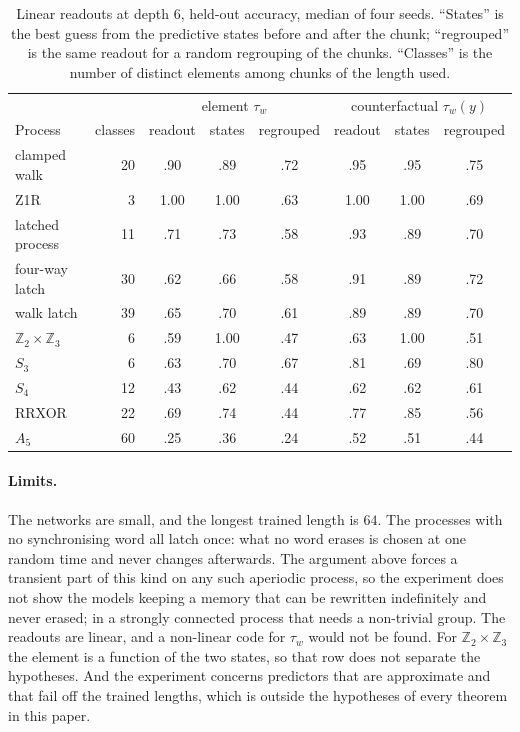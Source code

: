\documentclass[10pt]{article}
\theoremstyle{definition}
\theoremstyle{remark}
\begin{document}
\begin{table}[ht]
\centering
\small
\begin{tabular}{lrcccccc}
\hline
 & & \multicolumn{3}{c}{element $\tau_w$}
   & \multicolumn{3}{c}{counterfactual $\tau_w(y)$}\\
Process & classes & readout & states & regrouped
        & readout & states & regrouped\\
\hline
clamped walk & 20 & .90 & .89 & .72 & .95 & .95 & .75\\
Z1R & 3 & 1.00 & 1.00 & .63 & 1.00 & 1.00 & .69\\
latched process & 11 & .71 & .73 & .58 & .93 & .89 & .70\\
four-way latch & 30 & .62 & .66 & .58 & .91 & .89 & .72\\
walk latch & 39 & .65 & .70 & .61 & .89 & .89 & .70\\
$\mathbb Z_2\times\mathbb Z_3$ & 6 & .59 & 1.00 & .47 & .63 & 1.00 & .51\\
$S_3$ & 6 & .63 & .70 & .67 & .81 & .69 & .80\\
$S_4$ & 12 & .43 & .62 & .44 & .62 & .62 & .61\\
RRXOR & 22 & .69 & .74 & .44 & .77 & .85 & .56\\
$A_5$ & 60 & .25 & .36 & .24 & .52 & .51 & .44\\
\hline
\end{tabular}
\caption{Linear readouts at depth $6$, held-out accuracy, median of
four seeds.  ``States'' is the best guess from the predictive states
before and after the chunk; ``regrouped'' is the same readout for a
random regrouping of the chunks.  ``Classes'' is the number of
distinct elements among chunks of the length used.}
\label{tab:a2-probe}
\end{table}

\paragraph{Limits.}
The networks are small, and the longest trained length is $64$.
The processes with no synchronising word all latch once: what no word erases is chosen at one random time and
never changes afterwards.  The argument above forces a transient
part of this kind on any such aperiodic process, so the experiment
does not show the models keeping a memory that can be rewritten
indefinitely and never erased; in a strongly connected process that
needs a non-trivial group.  The readouts are linear, and a
non-linear code for $\tau_w$ would not be found.  For $\mathbb Z_2\times\mathbb Z_3$ the element
is a function of the two states, so that row does not separate the
hypotheses.  And the experiment concerns predictors that are
approximate and that fail off the trained lengths, which is outside
the hypotheses of every theorem in this paper.
\end{document}
